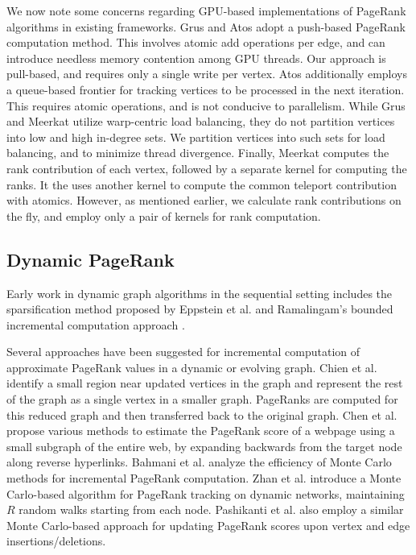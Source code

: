 We now note some concerns regarding GPU-based implementations of PageRank algorithms in existing frameworks. Grus \cite{wang2021grus} and Atos \cite{chen2022atos} adopt a push-based PageRank computation method. This involves atomic add operations per edge, and can introduce needless memory contention among GPU threads. Our approach is pull-based, and requires only a single write per vertex. Atos additionally employs a queue-based frontier for tracking vertices to be processed in the next iteration. This requires atomic operations, and is not conducive to parallelism. While Grus and Meerkat \cite{concessao2023meerkat} utilize warp-centric load balancing, they do not partition vertices into low and high in-degree sets. We partition vertices into such sets for load balancing, and to minimize thread divergence. Finally, Meerkat computes the rank contribution of each vertex, followed by a separate kernel for computing the ranks. It the uses another kernel to compute the common teleport contribution with atomics. However, as mentioned earlier, we calculate rank contributions on the fly, and employ only a pair of kernels for rank computation.




\subsection{Dynamic PageRank}

Early work in dynamic graph algorithms in the sequential setting includes the sparsification method proposed by Eppstein et al. \cite{graph-eppstein97} and Ramalingam's bounded incremental computation approach \cite{incr-ramalingam96}. Several approaches have been suggested for incremental computation of approximate PageRank values in a dynamic or evolving graph. Chien et al. \cite{rank-chien01} identify a small region near updated vertices in the graph and represent the rest of the graph as a single vertex in a smaller graph. PageRanks are computed for this reduced graph and then transferred back to the original graph. Chen et al. \cite{chen2004local} propose various methods to estimate the PageRank score of a webpage using a small subgraph of the entire web, by expanding backwards from the target node along reverse hyperlinks. Bahmani et al. \cite{bahmani2010fast} analyze the efficiency of Monte Carlo methods for incremental PageRank computation. Zhan et al. \cite{zhan2019fast} introduce a Monte Carlo-based algorithm for PageRank tracking on dynamic networks, maintaining $R$ random walks starting from each node. Pashikanti et al. \cite{rank-pashikanti22} also employ a similar Monte Carlo-based approach for updating PageRank scores upon vertex and edge insertions/deletions.

